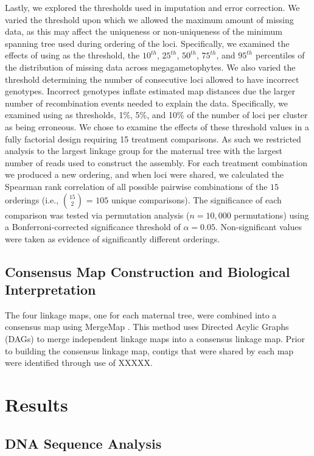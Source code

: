 \documentclass[11pt]{article}
\begin{document}
Lastly, we explored the thresholds used in imputation and error correction. We varied the threshold upon which 
we allowed the maximum amount of missing data, as this may affect the uniqueness 
or non-uniqueness of the minimum spanning tree used during ordering of the loci. Specifically, 
we examined the effects of using as the threshold, the $10^{th}$, $25^{th}$, $50^{th}$, $75^{th}$, and $95^{th}$ percentiles of 
the distribution of missing data across megagametophytes. We also varied the threshold determining 
the number of consecutive loci allowed to have incorrect genotypes. Incorrect genotypes inflate estimated 
map distances due the larger number of recombination events needed to explain the data. Specifically, we 
examined using as thresholds, 1\%, 5\%, and 10\% of the number of loci per cluster as being erroneous. We chose to 
examine the effects of these threshold values in a fully factorial design requiring 15 treatment comparisons. As such we restricted 
analysis to the largest linkage group for the maternal tree with the largest number of reads used to construct 
the assembly. For each treatment combination we produced a new ordering, and when loci were shared, we calculated 
the Spearman rank correlation of all possible pairwise combinations of the $15$ orderings (i.e., {$15 \choose 2$} = $105$ unique 
comparisons). The significance of each comparison was tested via permutation analysis ($n = 10,000$ permutations) 
using a Bonferroni-corrected significance threshold of $\alpha = 0.05$. Non-significant values were taken as evidence of significantly 
different orderings.

\subsection*{Consensus Map Construction and Biological Interpretation}\label{ss:consensus}
The four linkage maps, one for each maternal tree, were combined into a consensus map using MergeMap \citep{Wu:2008b}. This 
method uses Directed Acylic Graphs (DAGs) to merge independent linkage maps into a consensus linkage map. Prior to building the consensus 
linkage map, contigs that were shared by each map were identified through use of XXXXX.

\section*{Results}

\subsection*{DNA Sequence Analysis}
\end{document}
